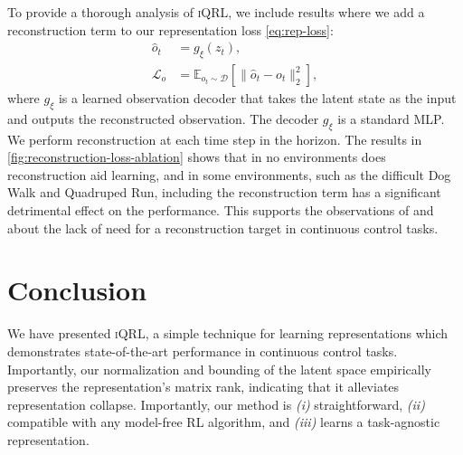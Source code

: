 \documentclass{article}
\theoremstyle{plain}
\theoremstyle{definition}
\theoremstyle{remark}
\newcommand{\our}{\textsc{iQRL}\xspace}
\begin{document}
To provide a thorough analysis of \our, we include results where we add a reconstruction term to our representation loss \cref{eq:rep-loss}:
\begin{align*}
	\hat{o}_t &= g_\xi(z_t), \\
	\mathcal{L}_o &= \mathbb{E}_{o_t\sim\mathcal{D}} [\| \hat{o}_t - o_t \|_2^2],
\end{align*}
where $g_\xi$ is a learned observation decoder that takes the latent state as the input and outputs the reconstructed observation. The decoder $g_\xi$ is a standard MLP. We perform reconstruction at each time step in the horizon.
The results in \cref{fig:reconstruction-loss-ablation} shows that in no environments does reconstruction aid learning, and in some environments, such as the difficult Dog Walk and Quadruped Run, including the reconstruction term has a significant detrimental effect on the performance.
This supports the observations of \citet{zhaoSimplifiedTemporalConsistency2023} and \citet{hansenTemporalDifferenceLearning2022} about the lack of need for a reconstruction target in continuous control tasks.









\section{Conclusion}
\label{conclusion}
We have presented \our, a simple technique for learning representations which demonstrates state-of-the-art performance in
continuous control tasks.
Importantly, our normalization and bounding of the latent space empirically preserves the representation's matrix rank,
indicating that it alleviates representation collapse.
Importantly, our method is {\em (i)} straightforward, {\em (ii)} compatible with any model-free RL algorithm,
and {\em (iii)} learns a task-agnostic representation.
\end{document}
